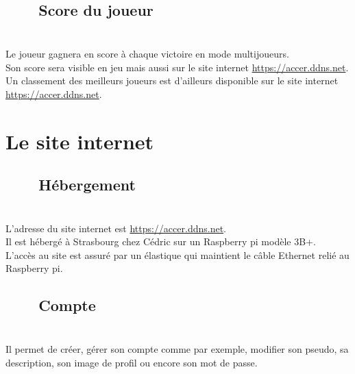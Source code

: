 \documentclass[titlepage, 13px, a4paper]{report}
\begin{document}
\subsection[Score du joueur]{~~~~Score du joueur}
\paragraph{} \hspace{0pt} \\
Le joueur gagnera en score à chaque victoire en mode multijoueurs. \\
Son score sera visible en jeu mais aussi sur le site internet \url{https://accer.ddns.net}. \\
Un classement des meilleurs joueurs est d’ailleurs disponible sur le site internet \url{https://accer.ddns.net}. \\


\newpage

\section{Le site internet}
\subsection[Hébergement]{~~~~Hébergement}
\paragraph{} \hspace{0pt} \\
L'adresse du site internet est \url{https://accer.ddns.net}. \\
Il est hébergé à Strasbourg chez Cédric sur un Raspberry pi modèle 3B+. \\
L’accès au site est assuré par un élastique qui maintient le câble Ethernet relié au Raspberry pi. \\

\subsection[Compte]{~~~~Compte}
\paragraph{} \hspace{0pt} \\
Il permet de créer, gérer son compte comme par exemple, modifier son pseudo, sa description, son image de profil ou encore son mot de passe. \\
\end{document}
